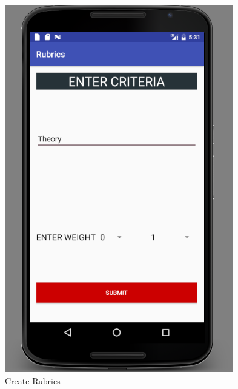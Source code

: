 \begin{figure}[!h]
\begin{minipage}[t]{0.5\linewidth}
\hfill\includegraphics[scale=.65]{project/images/createrubricnew}\hspace*{\fill}
    \caption{Create Rubrics}
    \label{f2}
\end{minipage}        
\end{figure}  

